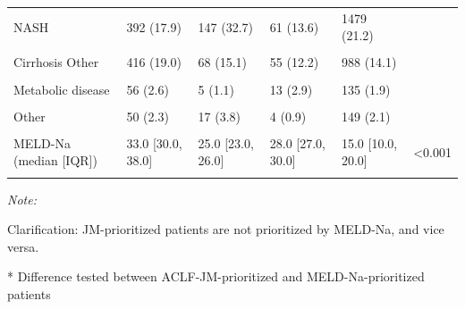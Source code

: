 \documentclass[11pt,english,]{book} %
\begin{document}
\begin{landscape}
\begin{table}
{\begin{threeparttable}
\begin{tabular}[t]{llllll}
\hspace{1em}NASH & 392 (17.9) & 147 (32.7) & 61 (13.6) & 1479 (21.2) & \\
\hspace{1em}\cellcolor{gray!6}{Cirrhosis Alcoholic} & \cellcolor{gray!6}{964 (44.1)} & \cellcolor{gray!6}{130 (28.9)} & \cellcolor{gray!6}{235 (52.2)} & \cellcolor{gray!6}{1768 (25.3)} & \cellcolor{gray!6}{}\\
\hspace{1em}Cirrhosis Other & 416 (19.0) & 68 (15.1) & 55 (12.2) & 988 (14.1) & \\
\hspace{1em}\cellcolor{gray!6}{Cholestatic disease} & \cellcolor{gray!6}{104 (4.8)} & \cellcolor{gray!6}{41 (9.1)} & \cellcolor{gray!6}{36 (8.0)} & \cellcolor{gray!6}{638 (9.1)} & \cellcolor{gray!6}{}\\
\hspace{1em}Metabolic disease & 56 (2.6) & 5 (1.1) & 13 (2.9) & 135 (1.9) & \\
\hspace{1em}\cellcolor{gray!6}{Malignant/benign tumor} & \cellcolor{gray!6}{39 (1.8)} & \cellcolor{gray!6}{11 (2.4)} & \cellcolor{gray!6}{7 (1.6)} & \cellcolor{gray!6}{734 (10.5)} & \cellcolor{gray!6}{}\\
\hspace{1em}Other & 50 (2.3) & 17 (3.8) & 4 (0.9) & 149 (2.1) & \\
\cellcolor{gray!6}{MELD (median [IQR])} & \cellcolor{gray!6}{34.0 [29.0, 39.0]} & \cellcolor{gray!6}{24.0 [21.0, 28.0]} & \cellcolor{gray!6}{26.0 [23.0, 29.0]} & \cellcolor{gray!6}{15.0 [11.0, 19.0]} & \cellcolor{gray!6}{<0.001}\\
MELD-Na (median [IQR]) & 33.0 [30.0, 38.0] & 25.0 [23.0, 26.0] & 28.0 [27.0, 30.0] & 15.0 [10.0, 20.0] & <0.001\\
\cellcolor{gray!6}{Life support dependent} & \cellcolor{gray!6}{291 (13.3)} & \cellcolor{gray!6}{84 (18.7)} & \cellcolor{gray!6}{3 (0.7)} & \cellcolor{gray!6}{50 (0.7)} & \cellcolor{gray!6}{<0.001}\\
\bottomrule
\end{tabular}
\begin{tablenotes}
\item \textit{Note: } 
\item Clarification: JM-prioritized patients are not prioritized by MELD-Na, and vice versa.
\item[*] Difference tested between ACLF-JM-prioritized and MELD-Na-prioritized patients
\end{tablenotes}
\end{threeparttable}}
\end{table}
\end{landscape}
\end{document}
